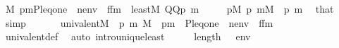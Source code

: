 \begin{isabellebody}
\ {\isachardoublequoteopen}M{\isacharcomma}{\kern0pt}\ {\isacharbrackleft}{\kern0pt}{\isasymrho}p{\isacharcomma}{\kern0pt}m{\isacharcomma}{\kern0pt}P{\isacharcomma}{\kern0pt}leq{\isacharcomma}{\kern0pt}one{\isacharbrackright}{\kern0pt}\ {\isacharat}{\kern0pt}\ nenv\ {\isasymTurnstile}\ {\isacharquery}{\kern0pt}f{\isacharunderscore}{\kern0pt}fm\ {\isasymlongleftrightarrow}\ least{\isacharparenleft}{\kern0pt}{\isacharhash}{\kern0pt}{\isacharhash}{\kern0pt}M{\isacharcomma}{\kern0pt}\ QQ{\isacharparenleft}{\kern0pt}{\isasymrho}p{\isacharparenright}{\kern0pt}{\isacharcomma}{\kern0pt}\ m{\isacharparenright}{\kern0pt}{\isachardoublequoteclose}\isanewline
\ \ \ \ \ {\isachardoublequoteopen}{\isasymrho}p{\isasymin}M{\isachardoublequoteclose}\ {\isachardoublequoteopen}{\isasymrho}p{\isasymin}{\isacharquery}{\kern0pt}{\isasympi}{\isachardoublequoteclose}\ {\isachardoublequoteopen}m{\isasymin}M{\isachardoublequoteclose}\ \ {\isasymrho}p\ m\ \isamarkupfalse%
\ that\ \isamarkupfalse%
\ simp\isanewline
\ \ \isamarkupfalse%
\isanewline
\ \ \isamarkupfalse%
\ {\isachardoublequoteopen}univalent{\isacharparenleft}{\kern0pt}{\isacharhash}{\kern0pt}{\isacharhash}{\kern0pt}M{\isacharcomma}{\kern0pt}\ {\isacharquery}{\kern0pt}{\isasympi}{\isacharcomma}{\kern0pt}\ {\isasymlambda}{\isasymrho}p\ m{\isachardot}{\kern0pt}\ M\ {\isacharcomma}{\kern0pt}\ {\isacharbrackleft}{\kern0pt}{\isasymrho}p{\isacharcomma}{\kern0pt}m{\isacharbrackright}{\kern0pt}\ {\isacharat}{\kern0pt}\ {\isacharparenleft}{\kern0pt}{\isacharbrackleft}{\kern0pt}P{\isacharcomma}{\kern0pt}leq{\isacharcomma}{\kern0pt}one{\isacharbrackright}{\kern0pt}\ {\isacharat}{\kern0pt}\ nenv{\isacharparenright}{\kern0pt}\ {\isasymTurnstile}\ {\isacharquery}{\kern0pt}f{\isacharunderscore}{\kern0pt}fm{\isacharparenright}{\kern0pt}{\isachardoublequoteclose}\isanewline
\ \ \ \ \isamarkupfalse%
\ univalent{\isacharunderscore}{\kern0pt}def\ \isamarkupfalse%
\ {\isacharparenleft}{\kern0pt}auto\ intro{\isacharcolon}{\kern0pt}unique{\isacharunderscore}{\kern0pt}least{\isacharparenright}{\kern0pt}\isanewline
\ \ \isamarkupfalse%
\ \isamarkupfalse%
\ {\isacartoucheopen}length{\isacharparenleft}{\kern0pt}{\isacharunderscore}{\kern0pt}{\isacharparenright}{\kern0pt}\ {\isacharequal}{\kern0pt}\ {\isacharunderscore}{\kern0pt}{\isacartoucheclose}\ {\isacartoucheopen}env\ {\isasymin}\ {\isacharunderscore}{\kern0pt}{\isacartoucheclose}\isanewline
\ \ \isamarkupfalse%

\end{isabellebody}
